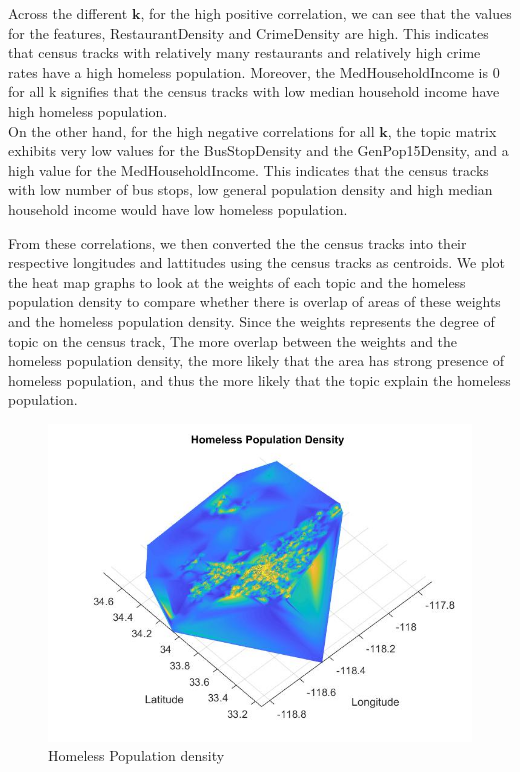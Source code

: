 \documentclass[11pt,letterpaper]{article}
\def\k{$\textbf{k}$}
\begin{document}
Across the different \k , for the high positive correlation, we can see that the values for the features, RestaurantDensity and CrimeDensity are high. This indicates that census tracks with relatively many restaurants and relatively high crime rates have a high homeless population. Moreover, the MedHouseholdIncome is 0 for all k signifies that the census tracks with low median household income have high homeless population. \\
On the other hand, for the high negative correlations for all \k , the topic matrix exhibits very low values for the BusStopDensity and the GenPop15Density, and a high value for the MedHouseholdIncome. This indicates that the census tracks with low number of bus stops, low general population density and high median household income would have low homeless population. 

From these correlations, we then converted the the census tracks into their respective longitudes and lattitudes using the census tracks as centroids. We plot the heat map graphs to look at the weights of each topic and the homeless population density to compare whether there is overlap of areas of these weights and the homeless population density. Since the weights represents the degree of topic on the census track, The more overlap between the weights and the homeless population density, the more likely that the area has strong presence of homeless population, and thus the more likely that the topic explain the homeless population.

\begin{figure}[H]
  \centering
  	\includegraphics[scale=0.5]{Homeless_pop.jpg}
  	\caption{Homeless Population density}
\end{figure}
\end{document}
